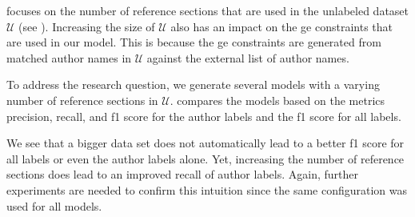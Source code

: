 \bigskip

 focuses on the number of reference sections that are used in the unlabeled dataset $\mathcal{U}$ (see ).
Increasing the size of $\mathcal{U}$ also has an impact on the \gls{ge} constraints that are used in our model.
This is because the \gls{ge} constraints are generated from matched author names in $\mathcal{U}$ against the external list of author names.

To address the research question, we generate several models with a varying number of reference sections in $\mathcal{U}$.
 compares the models based on the metrics \gls{precision}, \gls{recall}, and \gls{f1 score} for the author labels and the \gls{f1 score} for all labels.
\begin{table}
\hspace{-0.25\textwidth}
\caption{Comparison of models that use different numbers of reference sections for the model learning.}
\label{tab:eval-training-size}
\end{table}
We see that a bigger data set does not automatically lead to a better \gls{f1 score} for all labels or even the author labels alone.
Yet, increasing the number of reference sections does lead to an improved \gls{recall} of author labels.
Again, further experiments are needed to confirm this intuition since the same configuration was used for all models.

\bigskip

